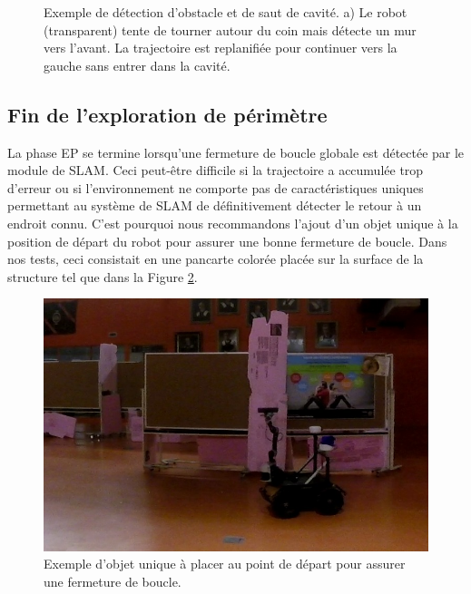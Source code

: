 \begin{figure}[ht]
\centering
{}
\hfil
{}
\caption{
Exemple de détection d'obstacle et de saut de cavité. a) Le robot (transparent) tente de tourner autour du coin mais détecte un mur vers l'avant. La trajectoire est replanifiée pour continuer vers la gauche sans entrer dans la cavité.}
\label{fig:ugv_exploration}
\end{figure}

\subsection{Fin de l'exploration de périmètre}

La phase EP se termine lorsqu'une fermeture de boucle globale est détectée par le module de SLAM. Ceci peut-être difficile si la trajectoire a accumulée trop d'erreur ou si l'environnement ne comporte pas de caractéristiques uniques permettant au système de SLAM de définitivement détecter le retour à un endroit connu. C'est pourquoi nous recommandons l'ajout d'un objet unique à la position de départ du robot pour assurer une bonne fermeture de boucle. Dans nos tests, ceci consistait en une pancarte colorée placée sur la surface de la structure tel que dans la Figure \ref{fig:ugv_pancarte}.

\begin{figure}[ht]
  \centering
  \includegraphics[width=0.5\linewidth]{images/ugv_unique.jpg}
  \caption{Exemple d'objet unique à placer au point de départ pour assurer une fermeture de boucle.}
  \label{fig:ugv_pancarte}
\end{figure}

